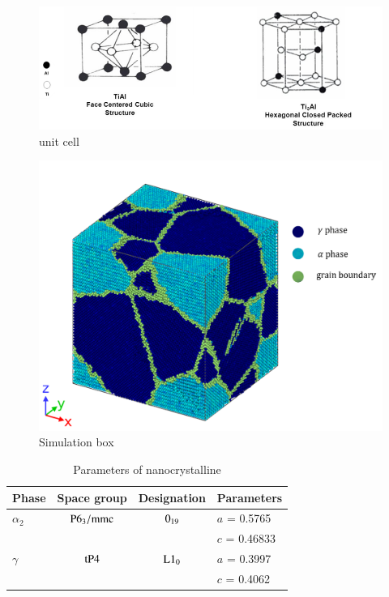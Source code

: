 \documentclass[final,5p,times,onecolumn]{elsarticle}
\begin{document}
\begin{figure}
	\centering
	\includegraphics[width=1\linewidth]{img/cell}
	\caption{unit cell}
	\label{fig:unit_cell}
\end{figure}

\begin{figure}
	\centering
	\includegraphics[width=1\linewidth]{img/pf_model_labeled}
	\caption{Simulation box}
	\label{fig:simulation_box}
\end{figure}

\begin{table}[h]
	\centering
	\caption{Parameters of  nanocrystalline}

	\begin{tabular}{l c c l}
			\hline
			Phase			& Space group		& Designation		& Parameters \\
			\hline
			$\alpha_2$		& $\rm P6_3/mmc$ 	& $\rm 0_{19}$ 		& $a$ = 0.5765 \\
							&					&					& $c$ = 0.46833 \\
			$\gamma$		& $\rm tP4$ 		& $\rm L1_0$		& $a$ = 0.3997 \\
			 				&					&					& $c$ = 0.4062 \\			
			\hline
	\end{tabular}
	\label{tab:lattice_parameter}
	\end{table}
 
\end{document}
